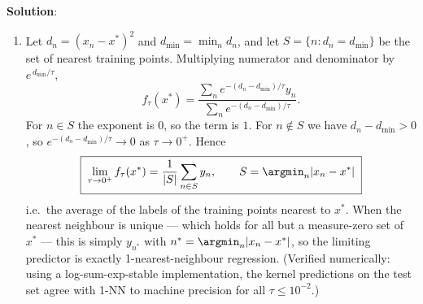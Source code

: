 \documentclass[submit]{../harvardml}
\newenvironment{solution}{
    \vspace{2mm}
    \color{blue}\noindent\textbf{Solution}:
}{}
\begin{document}
\begin{solution}
\begin{enumerate}
\begin{enumerate}
\textbf{Time (one prediction at $x^*$).}
\begin{itemize}
  \item Kernelized regression: evaluate $K_\tau(x_n, x^*)$ for all $n$ and form
    two sums, $\Theta(N)$ operations.
  \item kNN: compute all $N$ distances, $\Theta(N)$, then select the $k$
    smallest. With a linear-time selection algorithm this is $\Theta(N)$
    overall; a naive full sort gives $\Theta(N \log N)$. The provided
    implementation sorts, so it is $\Theta(N \log N)$.
\end{itemize}

So for both methods the cost of a single prediction grows linearly (up to a log
factor for sorted kNN) with $N$. This is the characteristic tradeoff of
non-parametric methods: zero training cost, but memory and prediction cost that
scale with the data --- in contrast to a parametric model, which pays a
one-time fitting cost and then predicts in time and space independent of $N$.

\item
Let $d_n = (x_n - x^*)^2$ and $d_{\min} = \min_n d_n$, and let
$S = \{ n : d_n = d_{\min}\}$ be the set of nearest training points. Multiplying
numerator and denominator by $e^{\,d_{\min}/\tau}$,
\[
  f_\tau(x^*)
  = \frac{\sum_n e^{-(d_n - d_{\min})/\tau} y_n}
         {\sum_n e^{-(d_n - d_{\min})/\tau}}.
\]
For $n \in S$ the exponent is $0$, so the term is $1$. For $n \notin S$ we have
$d_n - d_{\min} > 0$, so $e^{-(d_n - d_{\min})/\tau} \to 0$ as $\tau \to 0^+$.
Hence
\[
  \boxed{\;
  \lim_{\tau \to 0^+} f_\tau(x^*)
  = \frac{1}{|S|}\sum_{n \in S} y_n,
  \qquad S = \argmin_n |x_n - x^*| \;}
\]
i.e.\ the average of the labels of the training points nearest to $x^*$. When
the nearest neighbour is unique --- which holds for all but a measure-zero set
of $x^*$ --- this is simply $y_{n^*}$ with $n^* = \argmin_n |x_n - x^*|$, so
the limiting predictor is exactly 1-nearest-neighbour regression. (Verified
numerically: using a log-sum-exp-stable implementation, the kernel predictions
on the test set agree with 1-NN to machine precision for all $\tau \le 10^{-2}$.)

\end{enumerate}
\end{enumerate}

\end{solution}

\newpage
\end{document}
